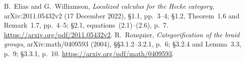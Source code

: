  B.~Elias and G.~Williamson,
\emph{Localized calculus for the Hecke category},
arXiv:2011.05432v2 (17 December 2022),
\S1.1, pp.~3--4; \S1.2, Theorem~1.6 and Remark~1.7,
pp.~4--5; \S2.1, equations~(2.1)--(2.6), p.~7.
\url{https://arxiv.org/pdf/2011.05432v2}.
 R.~Rouquier,
\emph{Categorification of the braid groups},
arXiv:math/0409593 (2004),
\S\S3.1.2--3.2.1, p.~6; \S3.2.4 and Lemma~3.3, p.~9;
\S3.3.1, p.~10.
\url{https://arxiv.org/pdf/math/0409593}.

